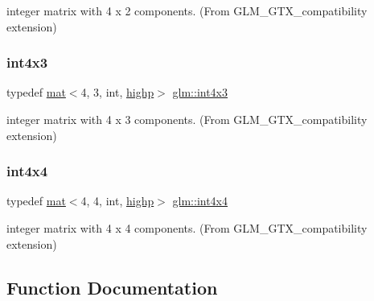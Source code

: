 integer matrix with 4 x 2 components. (From G\+L\+M\+\_\+\+G\+T\+X\+\_\+compatibility extension) 

\mbox{\label{group__gtx__compatibility_gadda7ab2670c41cbe997641db23ace3d2}} 
\subsubsection{\texorpdfstring{int4x3}{int4x3}}
{\footnotesize\ttfamily typedef \hyperlink{structglm_1_1mat}{mat}$<$4, 3, int, \hyperlink{namespaceglm_a36ed105b07c7746804d7fdc7cc90ff25ac6f7eab42eacbb10d59a58e95e362074}{highp}$>$ \hyperlink{group__gtx__compatibility_gadda7ab2670c41cbe997641db23ace3d2}{glm\+::int4x3}}



integer matrix with 4 x 3 components. (From G\+L\+M\+\_\+\+G\+T\+X\+\_\+compatibility extension) 

\mbox{\label{group__gtx__compatibility_ga4f4e5fb81339df0489d802fb9d574fd7}} 
\subsubsection{\texorpdfstring{int4x4}{int4x4}}
{\footnotesize\ttfamily typedef \hyperlink{structglm_1_1mat}{mat}$<$4, 4, int, \hyperlink{namespaceglm_a36ed105b07c7746804d7fdc7cc90ff25ac6f7eab42eacbb10d59a58e95e362074}{highp}$>$ \hyperlink{group__gtx__compatibility_ga4f4e5fb81339df0489d802fb9d574fd7}{glm\+::int4x4}}



integer matrix with 4 x 4 components. (From G\+L\+M\+\_\+\+G\+T\+X\+\_\+compatibility extension) 



\subsection{Function Documentation}
\mbox{\label{group__gtx__compatibility_gac63011205bf6d0be82589dc56dd26708}} 
